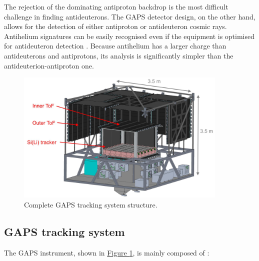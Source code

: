 \par
The rejection of the dominating antiproton backdrop is the most difficult challenge in finding antideuterons. The GAPS detector design, on the other hand, allows for the detection of either antiproton or antideuteron cosmic rays. Antihelium signatures can be easily recognised even if the equipment is optimised for antideuteron detection \cite{aramaki_2014_potential}. Because antihelium has a larger charge than antideuterons and antiprotons, its analysis is significantly simpler than the antideuterion-antiproton one.

\begin{figure}[ht]
    \centering
    \includegraphics[width=0.9\textwidth]{Images/appendGAPSintro/GAPS_tracker_structure.jpg}
    \caption{Complete GAPS tracking system structure.}
    \label{figGAPStrackerstructure}
\end{figure}


\subsection*{GAPS tracking system}
\label{gapsTrackingSystem}
The GAPS instrument, shown in \hyperref[figGAPStrackerstructure]{Figure \ref{figGAPStrackerstructure}}, is mainly composed of \cite{rogers_2019_largearea}:

